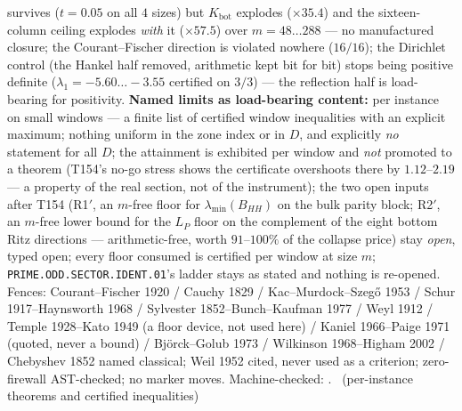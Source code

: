 \documentclass[11pt,a4paper]{article}
\begin{document}
survives ($t=0.05$ on all $4$ sizes) but $K_{\mathrm{bot}}$ explodes
($\times35.4$) and the sixteen-column ceiling explodes \emph{with} it
($\times57.5$) over $m=48\ldots288$ --- no manufactured closure; the
Courant--Fischer direction is violated nowhere ($16/16$); the Dirichlet
control (the Hankel half removed, arithmetic kept bit for bit) stops
being positive definite ($\lambda_1=-5.60\ldots-3.55$ certified on
$3/3$) --- the reflection half is load-bearing for positivity.
\textbf{Named limits as load-bearing content:} per instance on small
windows --- a finite list of certified window inequalities with an
explicit maximum; nothing uniform in the zone index or in $D$, and
explicitly \emph{no} statement for all $D$; the attainment is exhibited
per window and \emph{not} promoted to a theorem (T154's no-go stress
shows the certificate overshoots there by $1.12$--$2.19$ --- a property
of the real section, not of the instrument); the two open inputs after
T154 (R1$'$, an $m$-free floor for $\lambda_{\min}(B_{HH})$ on the bulk
parity block; R2$'$, an $m$-free lower bound for the $L_P$ floor on the
complement of the eight bottom Ritz directions --- arithmetic-free,
worth $91$--$100\%$ of the collapse price) stay \emph{open}, typed open;
every floor consumed is certified per window at size $m$;
\texttt{PRIME.ODD.SECTOR.IDENT.01}'s ladder stays as stated and nothing
is re-opened. Fences: Courant--Fischer 1920 / Cauchy 1829 /
Kac--Murdock--Szeg\H{o} 1953 / Schur 1917--Haynsworth 1968 / Sylvester
1852--Bunch--Kaufman 1977 / Weyl 1912 / Temple 1928--Kato 1949 (a floor
device, not used here) / Kaniel 1966--Paige 1971 (quoted, never a bound)
/ Bj\"orck--Golub 1973 / Wilkinson 1968--Higham 2002 / Chebyshev 1852
named classical; Weil 1952 cited, never used as a criterion;
zero-firewall AST-checked; no marker moves.
Machine-checked: .
\mE\ (per-instance theorems and certified inequalities)
\end{document}
